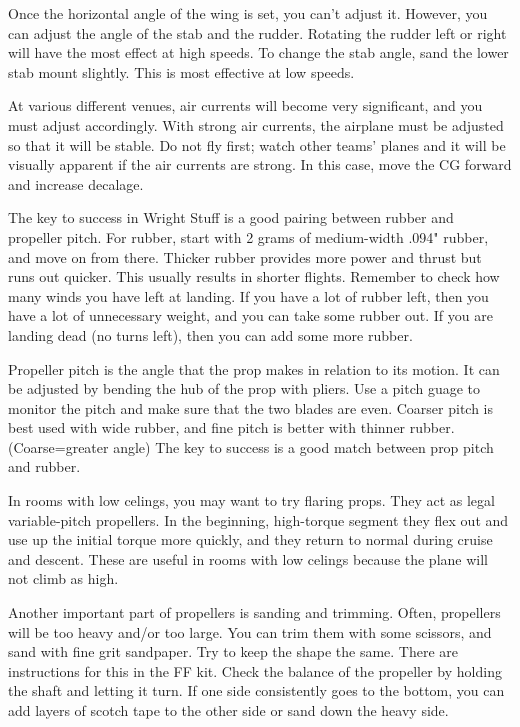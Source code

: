 \documentclass[twocolumn]{article}
\begin{document}
Once the horizontal angle of the wing is set, you can't adjust it. However, you can adjust the angle of the stab and the rudder. Rotating the rudder left or right will have the most effect at high speeds. To change the stab angle, sand the lower stab mount slightly. This is most effective at low speeds. 

At various different venues, air currents will become very significant, and you must adjust accordingly. With strong air currents, the airplane must be adjusted so that it will be stable. Do not fly first; watch other teams' planes and it will be visually apparent if the air currents are strong. In this case, move the CG forward and increase decalage. 

The key to success in Wright Stuff is a good pairing between rubber and propeller pitch. For rubber, start with 2 grams of medium-width .094" rubber, and move on from there. Thicker rubber provides more power and thrust but runs out quicker. This usually results in shorter flights. Remember to check how many winds you have left at landing. If you have a lot of rubber left, then you have a lot of unnecessary weight, and you can take some rubber out. If you are landing dead (no turns left), then you can add some more rubber. 

Propeller pitch is the angle that the prop makes in relation to its motion. It can be adjusted by bending the hub of the prop with pliers. Use a pitch guage to monitor the pitch and make sure that the two blades are even. Coarser pitch is best used with wide rubber, and fine pitch is better with thinner rubber. (Coarse=greater angle) The key to success is a good match between prop pitch and rubber. 

In rooms with low celings, you may want to try flaring props. They act as legal variable-pitch propellers. In the beginning, high-torque segment they flex out and use up the initial torque more quickly, and they return to normal during cruise and descent. These are useful in rooms with low celings because the plane will not climb as high. 

Another important part of propellers is sanding and trimming. Often, propellers will be too heavy and/or too large. You can trim them with some scissors, and sand with fine grit sandpaper. Try to keep the shape the same. There are instructions for this in the FF kit. Check the balance of the propeller by holding the shaft and letting it turn. If one side consistently goes to the bottom, you can add layers of scotch tape to the other side or sand down the heavy side. 
\end{document}
